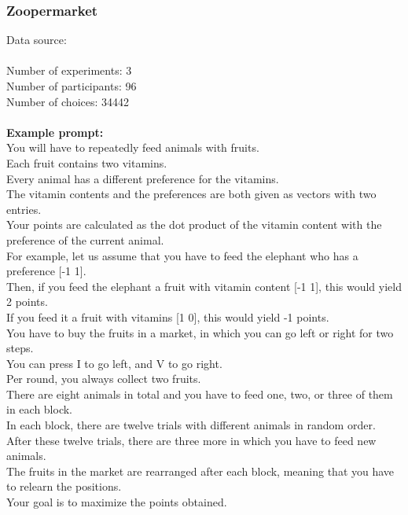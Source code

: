 \documentclass[pdflatex,sn-nature]{sn-jnl}%
\theoremstyle{thmstyleone}%
\theoremstyle{thmstyletwo}%
\theoremstyle{thmstylethree}%
\begin{document}
\subsubsection*{Zoopermarket}
Data source: \cite{Ludwig2023} \\ $~$ \\
Number of experiments: 3 $~$\\ 
Number of participants: 96 $~$\\ 
Number of choices: 34442 $~$\\ 
 $~$\\ 
\textbf{Example prompt:}
 $~$\\ 
You will have to repeatedly feed animals with fruits. $~$\\ 
Each fruit contains two vitamins. $~$\\ 
Every animal has a different preference for the vitamins. $~$\\ 
The vitamin contents and the preferences are both given as vectors with two entries. $~$\\ 
Your points are calculated as the dot product of the vitamin content with the preference of the current animal. $~$\\ 
For example, let us assume that you have to feed the elephant who has a preference [-1  1]. $~$\\ 
Then, if you feed the elephant a fruit with vitamin content [-1  1], this would yield 2 points. $~$\\ 
If you feed it a fruit with vitamins [1 0], this would yield -1 points. $~$\\ 
You have to buy the fruits in a market, in which you can go left or right for two steps. $~$\\ 
You can press I to go left, and V to go right. $~$\\ 
Per round, you always collect two fruits. $~$\\ 
There are eight animals in total and you have to feed one, two, or three of them in each block. $~$\\ 
In each block, there are twelve trials with different animals in random order. $~$\\ 
After these twelve trials, there are three more in which you have to feed new animals. $~$\\ 
The fruits in the market are rearranged after each block, meaning that you have to relearn the positions. $~$\\ 
Your goal is to maximize the points obtained. $~$\\ 
 $~$\\ 
\end{document}
